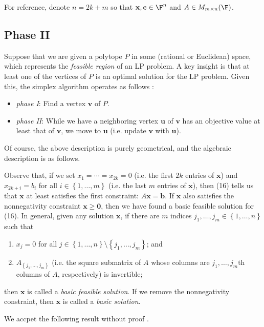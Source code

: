 \documentclass{article}
\renewcommand{\vec}{\mathbf}
\begin{document}
For reference, denote $n = 2k+m$ so that $\vec{x},\vec{c}\in\F^n$ and $A\in M_{m\times n}(\F)$. 

\subsection{Phase II}

Suppose that we are given a polytope $P$ in some (rational or Euclidean) space, which represents the \textit{feasible region} of an LP problem. A key insight is that at least one of the vertices of $P$ is an optimal solution for the LP problem. Given this, the simplex algorithm operates as follows \cite{LPE}:
\begin{itemize}
    \item \textit{phase I}: Find a vertex $\vec{v}$ of $P$.
    \item \textit{phase II}: While we have a neighboring vertex $\vec{u}$ of $\vec{v}$ has an objective value at least that of $\vec{v}$, we move to $\vec{u}$ (i.e. update $\vec{v}$ with $\vec{u}$).
\end{itemize} 
Of course, the above description is purely geometrical, and the algebraic description is as follows.

Observe that, if we set $x_1=\cdots=x_{2k} = 0$ (i.e. the first $2k$ entries of $\vec{x}$) and $x_{2k+i} = b_i$ for all $i\in\left\lbrace 1,\ldots,m \right\rbrace $ (i.e. the last $m$ entries of $\vec{x}$), then (16) tells us that $\vec{x}$ at least satisfies the first constraint: $A\vec{x}=\vec{b}$. If $\vec{x}$ also satisfies the nonnegativity constraint $\vec{x}\geq\vec{0}$, then we have found a basic feasible solution for (16). In general, given any solution $\vec{x}$, if there are $m$ indices $j_1,\ldots,j_m\in\left\lbrace 1,\ldots,n \right\rbrace$ such that
\begin{enumerate}
    \item $x_j=0$ for all $j\in\left\lbrace 1,\ldots,n \right\rbrace \setminus \left\lbrace j_1,\ldots,j_m \right\rbrace$; and
    \item $A_{\left\lbrace j_1,\ldots,j_m \right\rbrace }$ (i.e. the square submatrix of $A$ whose columns are $j_1,\ldots,j_m$th columns of $A$, respectively) is invertible;
\end{enumerate}
then $\vec{x}$ is called a \textit{basic feasible solution}. If we remove the nonnegativity constraint, then $\vec{x}$ is called a \textit{basic solution}.

We accpet the following result without proof \cite{UULP}.
\end{document}

